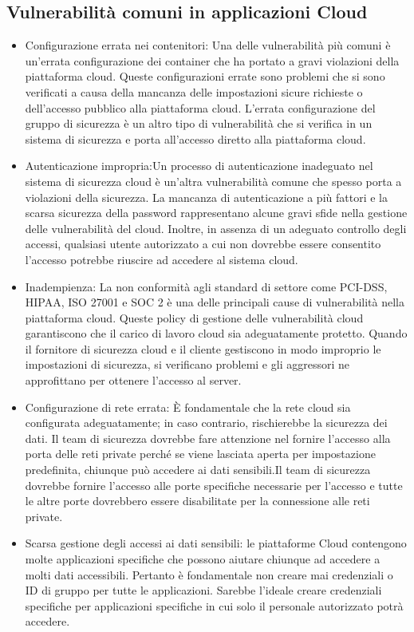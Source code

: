 \subsection{Vulnerabilità comuni in applicazioni Cloud}
\begin{itemize}
    \item Configurazione errata nei contenitori: Una delle vulnerabilità più comuni è un’errata configurazione dei container che ha portato a gravi violazioni della piattaforma cloud.
    Queste configurazioni errate sono problemi che si sono verificati a causa della mancanza delle impostazioni sicure richieste o dell'accesso pubblico alla piattaforma cloud. L'errata configurazione del gruppo di sicurezza è un altro tipo di vulnerabilità che si verifica in un sistema di sicurezza e porta all'accesso diretto alla piattaforma cloud.
    \item Autenticazione impropria:Un processo di autenticazione inadeguato nel sistema di sicurezza cloud è un’altra vulnerabilità comune che spesso porta a violazioni della sicurezza. La mancanza di autenticazione a più fattori e la scarsa sicurezza della password rappresentano alcune gravi sfide nella gestione delle vulnerabilità del cloud.
    Inoltre, in assenza di un adeguato controllo degli accessi, qualsiasi utente autorizzato a cui non dovrebbe essere consentito l'accesso potrebbe riuscire ad accedere al sistema cloud.
    \item Inadempienza: La non conformità agli standard di settore come PCI-DSS, HIPAA, ISO 27001 e SOC 2 è una delle principali cause di vulnerabilità nella piattaforma cloud. Queste policy di gestione delle vulnerabilità cloud garantiscono che il carico di lavoro cloud sia adeguatamente protetto.
    Quando il fornitore di sicurezza cloud e il cliente gestiscono in modo improprio le impostazioni di sicurezza, si verificano problemi e gli aggressori ne approfittano per ottenere l’accesso al server. 
    \item Configurazione di rete errata: È fondamentale che la rete cloud sia configurata adeguatamente; in caso contrario, rischierebbe la sicurezza dei dati. Il team di sicurezza dovrebbe fare attenzione nel fornire l'accesso alla porta delle reti private perché se viene lasciata aperta per impostazione predefinita, chiunque può accedere ai dati sensibili.Il team di sicurezza dovrebbe fornire l'accesso alle porte specifiche necessarie per l'accesso e tutte le altre porte dovrebbero essere disabilitate per la connessione alle reti private.
    \item Scarsa gestione degli accessi ai dati sensibili: le piattaforme Cloud contengono molte applicazioni specifiche che possono aiutare chiunque ad accedere a molti dati accessibili. Pertanto è fondamentale non creare mai credenziali o ID di gruppo per tutte le applicazioni. Sarebbe l’ideale creare credenziali specifiche per applicazioni specifiche in cui solo il personale autorizzato potrà accedere.

\end{itemize}
